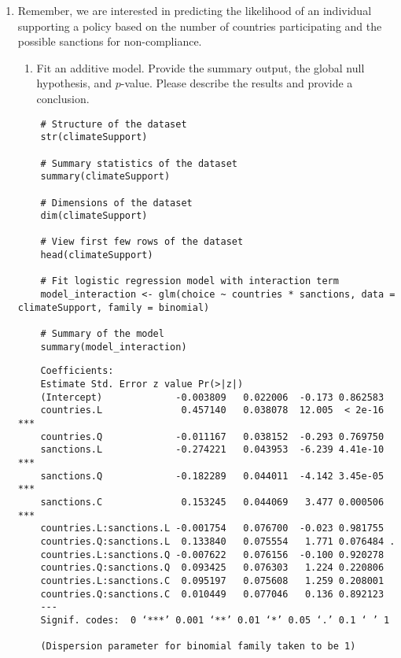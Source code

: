 \documentclass[12pt,letterpaper]{article}
\begin{document}
\begin{enumerate}
	\item
	Remember, we are interested in predicting the likelihood of an individual supporting a policy based on the number of countries participating and the possible sanctions for non-compliance.
	\begin{enumerate}
		\item [] Fit an additive model. Provide the summary output, the global null hypothesis, and $p$-value. Please describe the results and provide a conclusion.
	\end{enumerate}
	
	\begin{lstlisting}
	# Structure of the dataset
	str(climateSupport)
	
	# Summary statistics of the dataset
	summary(climateSupport)
	
	# Dimensions of the dataset
	dim(climateSupport)
	
	# View first few rows of the dataset
	head(climateSupport)
	
	# Fit logistic regression model with interaction term
	model_interaction <- glm(choice ~ countries * sanctions, data = climateSupport, family = binomial)
	
	# Summary of the model
	summary(model_interaction)
	\end{lstlisting}
	\begin{verbatim}
	Coefficients:
	Estimate Std. Error z value Pr(>|z|)    
	(Intercept)             -0.003809   0.022006  -0.173 0.862583    
	countries.L              0.457140   0.038078  12.005  < 2e-16 ***
	countries.Q             -0.011167   0.038152  -0.293 0.769750    
	sanctions.L             -0.274221   0.043953  -6.239 4.41e-10 ***
	sanctions.Q             -0.182289   0.044011  -4.142 3.45e-05 ***
	sanctions.C              0.153245   0.044069   3.477 0.000506 ***
	countries.L:sanctions.L -0.001754   0.076700  -0.023 0.981755    
	countries.Q:sanctions.L  0.133840   0.075554   1.771 0.076484 .  
	countries.L:sanctions.Q -0.007622   0.076156  -0.100 0.920278    
	countries.Q:sanctions.Q  0.093425   0.076303   1.224 0.220806    
	countries.L:sanctions.C  0.095197   0.075608   1.259 0.208001    
	countries.Q:sanctions.C  0.010449   0.077046   0.136 0.892123    
	---
	Signif. codes:  0 ‘***’ 0.001 ‘**’ 0.01 ‘*’ 0.05 ‘.’ 0.1 ‘ ’ 1
	
	(Dispersion parameter for binomial family taken to be 1)
	

\end{verbatim}
\end{enumerate}
\end{document}
